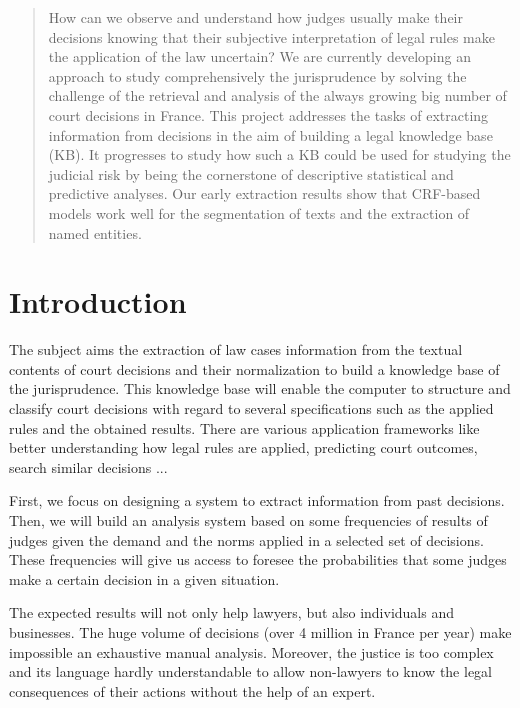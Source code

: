 \documentclass[runningheads,a4paper]{llncs}
\begin{document}
\begin{abstract}
How can we observe and understand how judges usually make their decisions knowing that their subjective interpretation of legal rules make the application of the law uncertain? We are currently developing an approach to study comprehensively the jurisprudence by solving the challenge of the retrieval and analysis of the always growing big number of court decisions in France. This project addresses the tasks of extracting information from decisions in the aim of building a legal knowledge base (KB). It progresses to study how such a KB could be used for studying the judicial risk by being the cornerstone of descriptive statistical and predictive analyses. Our early extraction results show that CRF-based models work well for the segmentation of texts and the extraction of named entities. 

\end{abstract}


\section{Introduction}

The subject aims the extraction of law cases information from the textual contents of court decisions and their normalization to build a knowledge base of the jurisprudence. This knowledge base will enable the computer to structure and classify court decisions with regard to several specifications such as the applied rules and the obtained results. There are various application frameworks like better understanding how legal rules are applied, predicting court outcomes, search similar decisions ... 

First, we focus on designing a system to extract information from past decisions. Then, we will build an analysis  system based on some frequencies of results of judges given the demand and the norms applied in a selected  set of decisions. These frequencies will give us access to foresee the probabilities that some judges make a certain decision in a given situation.

The expected results will not only help lawyers, but also individuals and businesses. The huge volume of decisions (over 4 million in France per year) make impossible an exhaustive manual analysis. Moreover, the justice is too complex and its language hardly understandable to allow non-lawyers to know the legal consequences of their actions without the help of an expert.
\end{document}
